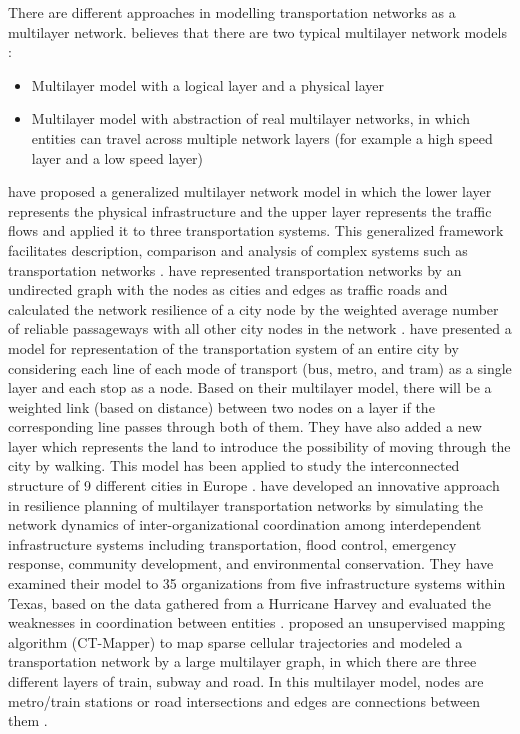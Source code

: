 \documentclass[11pt,twoside]{article}
\numberwithin{equation}{section}
\newcommand{\?}{\stackrel{?}{=}}
\begin{document}
There are different approaches in modelling transportation networks as a multilayer network. \citep{wu2020traffica} believes that there are two typical multilayer network models \citep{wu2020traffica}:
\begin{itemize}
  \item Multilayer model with a logical layer and a physical layer
  \item Multilayer model with abstraction of real multilayer networks, in which entities can travel across multiple network layers (for example a high speed layer and a low speed layer)
\end{itemize}
\citet{kurant2006layered} have proposed a generalized multilayer network model in which the lower layer represents the physical infrastructure and the upper layer represents the traffic flows and applied it to three transportation systems. This generalized framework facilitates description, comparison and analysis of complex systems such as transportation networks \citep{kurant2006layered}. \citet{ip2011resilience} have represented transportation networks by an undirected graph with the nodes as cities and edges as traffic roads and calculated the network resilience of a
city node by the weighted average number of
reliable passageways with all other city nodes in the network  \citep{ip2011resilience}. \citet{aleta2017multilayer} have presented a model for representation of the transportation system of an entire city by considering each line of each mode of transport (bus, metro, and tram) as a single layer and each stop as a node. Based on their multilayer model, there will be a weighted link (based on distance) between two nodes on a layer if the corresponding line passes through both of them. They have also added a new layer which represents the land to introduce the possibility of moving through the city by walking. This model has been applied to study the interconnected structure of 9 different cities in Europe \citep{aleta2017multilayer}.
\citet{li2019modeling} have developed an innovative approach in resilience planning of multilayer transportation networks by simulating the network dynamics of inter-organizational coordination among interdependent infrastructure systems including transportation, flood control, emergency response, community development, and environmental conservation. They have examined their model to 35 organizations from five infrastructure systems within Texas, based on the data gathered from a Hurricane Harvey and evaluated the weaknesses in coordination between entities \citep{li2019modeling}. \citet{asgari2016ctmapper} proposed an unsupervised mapping algorithm (CT-Mapper) to map sparse cellular trajectories and  modeled a transportation network by a large multilayer graph, in which there are three different layers of train, subway and road. In this multilayer model, nodes are metro/train stations or road intersections and edges are connections between them \citep{asgari2016ctmapper}.
\end{document}
